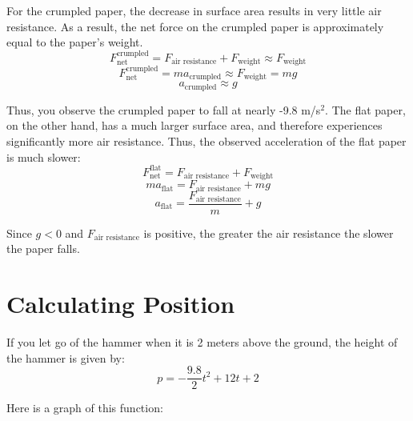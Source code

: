 For the crumpled paper, the decrease in surface area results in very little air 
resistance. As a result, the net force on the crumpled paper is approximately 
equal to the paper's weight. 
$$F_{\text{net}}^{\text{crumpled}} = F_{\text{air resistance}} + 
F_{\text{weight}} \approx F_{\text{weight}}$$
$$F_{\text{net}}^{\text{crumpled}} = ma_{\text{crumpled}} \approx 
F_{\text{weight}} = mg$$
$$a_{\text{crumpled}} \approx g$$

Thus, you observe the crumpled paper to fall at nearly -9.8 m/s$^2$. The flat 
paper, on the other hand, has a much larger surface area, and therefore 
experiences significantly more air resistance. Thus, the observed acceleration 
of the flat paper is much slower:
$$F_{\text{net}}^{\text{flat}} = F_{\text{air resistance}} + 
F_{\text{weight}}$$
$$ma_{\text{flat}} = F_{\text{air resistance}} + mg$$
$$a_{\text{flat}} = \frac{F_{\text{air resistance}}}{m} + g$$

Since $g<0$ and $F_{\text{air resistance}}$ is positive, the greater the air 
resistance the slower the paper falls. 

\section{Calculating Position}

If you let go of the hammer when it is 2 meters
above the ground, the height of the hammer is given by:
\begin{equation*}
  p = -\frac{9.8}{2}t^2 + 12t + 2
\end{equation*}

Here is a graph of this function:



